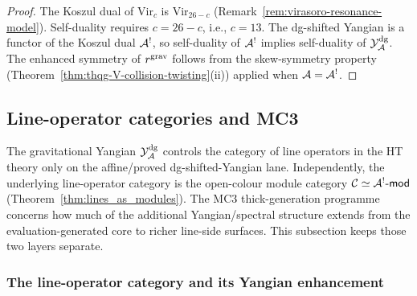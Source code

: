 \begin{proof}
The Koszul dual of $\mathrm{Vir}_c$ is $\mathrm{Vir}_{26-c}$
(Remark~\ref{rem:virasoro-resonance-model}).
Self-duality requires $c = 26 - c$, i.e., $c = 13$.
The dg-shifted Yangian is a functor of the Koszul dual
$\mathcal{A}^!$, so self-duality of $\mathcal{A}^!$ implies self-duality of
$\mathcal{Y}^{\mathrm{dg}}_{\mathcal{A}}$. The enhanced symmetry of $r^{\mathrm{grav}}$ follows from the
skew-symmetry property (Theorem~\ref{thm:thqg-V-collision-twisting}(ii))
applied when $\mathcal{A} = \mathcal{A}^!$.
\end{proof}


%
%

\subsection{Line-operator categories and MC3}
\label{subsec:thqg-V-line-operators-mc3}

The gravitational Yangian $\mathcal{Y}^{\mathrm{dg}}_{\mathcal{A}}$ controls the category of line
operators in the HT theory only on the affine/proved dg-shifted-Yangian
lane. Independently, the underlying line-operator category is the
open-colour module category $\mathcal{C} \simeq \mathcal{A}^!\text{-}\mathsf{mod}$
\textup{(}Theorem~\textup{\ref{thm:lines_as_modules})}. The MC3
thick-generation programme concerns how much of the additional
Yangian/spectral structure extends from the evaluation-generated core
to richer line-side surfaces. This subsection keeps those two layers
separate.


\subsubsection{The line-operator category and its Yangian enhancement}

